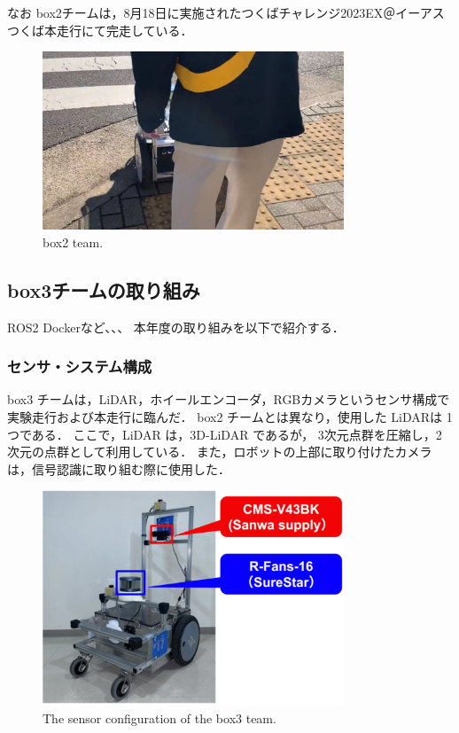 \documentclass[twocolumn, 9pt]{jsproceedings}
\begin{document}
なお box2チームは，8月18日に実施されたつくばチャレンジ2023EX＠イーアスつくば本走行にて完走している．

\begin{figure}[h!]
  \centering
  \includegraphics[width=90mm]{fig/result_box2_cut.pdf}
  \caption{box2 team.}
  \label{fig:box2-result}
\end{figure}



\subsection{box3チームの取り組み}
ROS2 Dockerなど、、、
本年度の取り組みを以下で紹介する．

\subsubsection{センサ・システム構成}
box3 チームは，LiDAR，ホイールエンコーダ，RGBカメラというセンサ構成で実験走行および本走行に臨んだ．
box2 チームとは異なり，使用した LiDARは 1つである．
ここで，LiDAR は，3D-LiDAR であるが，
3次元点群を圧縮し，2次元の点群として利用している．
また，ロボットの上部に取り付けたカメラは，信号認識に取り組む際に使用した．

\begin{figure}[h!]
  \centering
  \includegraphics[width=90mm]{fig/box3_sensor.pdf}
  \caption{The sensor configuration of the box3 team.}
  \label{fig:box3-sensor}
\end{figure}
\end{document}
